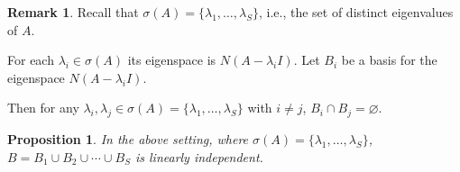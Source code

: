 \documentclass[12pt]{article}
\newtheorem*{proposition}{Proposition}
\theoremstyle{definition}
\newtheorem*{remark}{Remark}
\begin{document}
\begin{remark}

\noindent Recall that $\sigma(A) = \{\lambda_1, \ldots, \lambda_S\}$, i.e., the set of distinct
eigenvalues of $A$.

For each $\lambda_i \in \sigma(A)$ its eigenspace is $N(A - \lambda_i I)$. Let $B_i$ be a
basis for the eigenspace $N(A - \lambda_i I)$.

Then for any $\lambda_i, \lambda_j \in \sigma(A) = \{\lambda_1, \ldots, \lambda_S\}$ with $i \neq j$, 
$B_i \cap B_j = \varnothing$.
\end{remark}

\begin{proposition}
In the above setting, where $\sigma(A) = \{\lambda_1, \ldots, \lambda_S\}$,
$B = B_1 \cup B_2 \cup \cdots \cup B_S$ is linearly independent.
\end{proposition}
\end{document}
